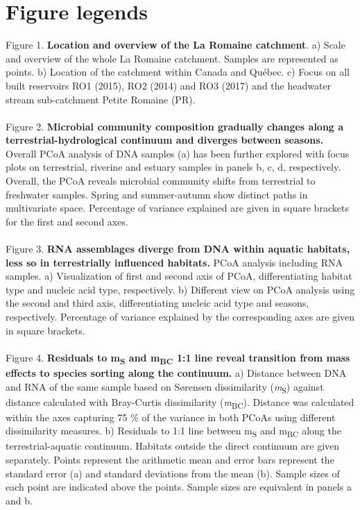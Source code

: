 \documentclass[12pt,a4paper]{article} %
\begin{document}
\section*{Figure legends}
Figure 1. \textbf{Location and overview of the La Romaine catchment}. a) Scale and overview of the whole La Romaine catchment. Samples are represented as points. b) Location of the catchment within Canada and Québec. c) Focus on all built reservoirs RO1 (2015), RO2 (2014) and RO3 (2017) and the headwater stream sub-catchment Petite Romaine (PR).\\
\\
Figure 2. \textbf{Microbial community composition gradually changes along a terrestrial-hydrological continuum and diverges between seasons.} Overall PCoA analysis of DNA samples (a) has been further explored with focus plots on terrestrial, riverine and estuary samples in panels b, c, d, respectively. Overall, the PCoA reveals microbial community shifts from terrestrial to freshwater samples. Spring and summer-autumn show distinct paths in multivariate space. Percentage of variance explained are given in square brackets for the first and second axes. \\
\\
Figure 3. \textbf{RNA assemblages diverge from DNA within aquatic habitats, less so in terrestrially influenced habitats.} PCoA analysis including RNA samples. a) Visualization of first and second axis of PCoA, differentiating habitat type and nucleic acid type, respectively. b) Different view on PCoA analysis using the second and third axis, differentiating nucleic acid type and seasons, respectively. Percentage of variance explained by the corresponding axes are given in square brackets.\\
\\
Figure 4. \textbf{Residuals to m\textsubscript{S} and m\textsubscript{BC} 1:1 line reveal transition from mass effects to species sorting along the continuum.} a) Distance between DNA and RNA of the same sample based on S{\o}rensen dissimilarity (\textit{m}\textsubscript{S}) against distance calculated with Bray-Curtis dissimilarity (\textit{m}\textsubscript{BC}). Distance was calculated within the axes capturing 75 \% of the variance in both PCoAs using different dissimilarity measures. b) Residuals to 1:1 line between m\textsubscript{S} and m\textsubscript{BC} along the terrestrial-aquatic continuum. Habitats outside the direct continuum are given separately. Points represent the arithmetic mean and error bars represent the standard error (a) and standard deviations from the mean (b). Sample sizes of each point are indicated above the points. Sample sizes are equivalent in panels a and b. \\
\end{document}

